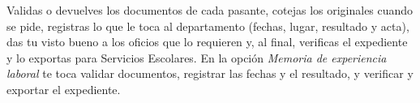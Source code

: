 \documentclass[11pt,a4paper]{article}
\begin{document}
{\small\tableofcontents}
\newpage
\begin{quevasahacer}
Validas o devuelves los documentos de cada pasante, cotejas los originales cuando se pide, registras lo que le toca al departamento (fechas, lugar, resultado y acta), das tu visto bueno a los oficios que lo requieren y, al final, verificas el expediente y lo exportas para Servicios Escolares. En la opción \emph{Memoria de experiencia laboral} te toca validar documentos, registrar las fechas y el resultado, y verificar y exportar el expediente.
\end{quevasahacer}



\end{document}
